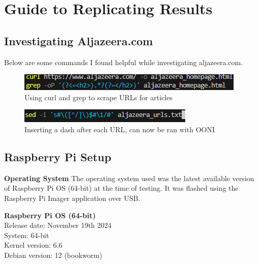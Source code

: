 \section{Guide to Replicating Results}

\subsection{Investigating Aljazeera.com}
Below are some commands I found helpful while investigating aljazeera.com.

\begin{figure} [H]
    \centering
    \includegraphics[width=1\linewidth]{AljazeeraURLs1.png}
    \caption{Using curl and grep to scrape URLs for articles}
    \label{fig:enter-label}
\end{figure}

\begin{figure} [H]
    \centering
\includegraphics[width=1\linewidth]{AljazeeraComs2.png}
    \caption{Inserting a dash after each URL, can now be ran with OONI}
    \label{fig:enter-label}
\end{figure}


\subsection{Raspberry Pi Setup}
\textbf{Operating System}
The operating system used was the latest available version of Raspberry Pi OS (64-bit) at the time of testing. It was flashed using the Raspberry Pi Imager application over USB. 

\begin{flushleft}
\hspace{1em}\textbf{Raspberry Pi OS (64-bit)}\\[0.5em]
\hspace{1em}Release date: November 19th 2024\\[0.5em]
\hspace{1em}System: 64-bit\\[0.5em]
\hspace{1em}Kernel version: 6.6\\[0.5em]
\hspace{1em}Debian version: 12 (bookworm)
\end{flushleft}


